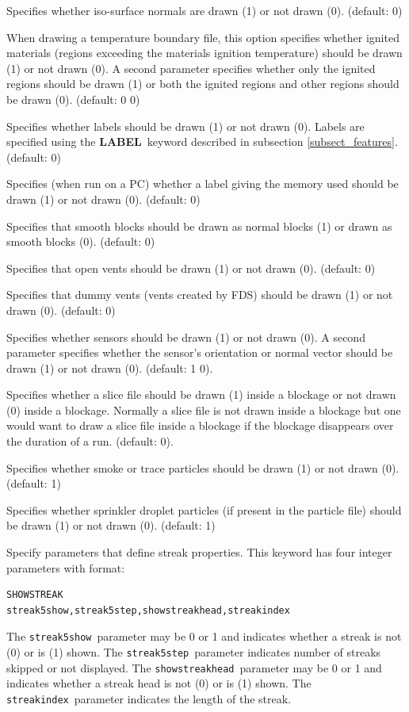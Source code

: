 \documentclass[11pt,twoside]{book}
\newcommand{\hitem}[1]{\item[{\bf #1} \hfill]}
\begin{document}
\hitem{SHOWISONORMALS} Specifies whether iso-surface normals are drawn (1) or not drawn (0).  (default: 0)

\hitem{SHOWIGNITION} When drawing a temperature boundary file, this option
specifies whether ignited materials (regions exceeding the materials ignition temperature) should be drawn (1) or not drawn (0).  A second parameter specifies whether only the ignited regions should be drawn (1) or both the ignited regions and other regions should be drawn (0).
(default: 0 0)


\hitem{SHOWLABELS}Specifies whether labels should be drawn (1) or
not drawn (0).  Labels are specified using the {\bf LABEL}\
keyword described in subsection \ref{subsect_features}. (default:
0)

\hitem{SHOWMEMLOAD} Specifies (when run on a PC) whether a label
giving the memory used should be drawn (1) or not drawn (0).
(default: 0)

\hitem{SHOWNORMALWHENSMOOTH} Specifies that smooth blocks
should be drawn as normal blocks (1) or drawn as smooth
blocks (0). (default: 0)

\hitem{SHOWOPENVENTS} Specifies that open vents should be drawn
(1) or not drawn (0).  (default: 0)

\hitem{SHOWDUMMYVENTS} Specifies that dummy vents (vents created
by FDS) should be drawn (1) or not drawn (0).  (default: 0)

\hitem{SHOWSENSORS} Specifies whether sensors should be drawn (1) or not drawn (0).
A second parameter specifies whether the sensor's orientation or normal vector
should be drawn (1) or not drawn (0). (default: 1 0).

\hitem{SHOWSLICEINOBST} Specifies whether a slice file should be drawn (1) inside
a blockage or not drawn (0) inside a blockage.  Normally a slice file is not drawn inside a blockage but one would want to draw a
slice file inside a blockage if the blockage disappears over the duration of a run.  (default: 0).


\hitem{SHOWSMOKEPART}Specifies whether smoke or trace particles
should be drawn (1) or not drawn (0). (default: 1)

\hitem{SHOWSPRINKPART}Specifies whether
sprinkler droplet particles (if present in the particle file)
should be drawn (1) or not drawn (0).
(default: 1)

\hitem{SHOWSTREAK}Specify parameters that define streak properties.  This keyword
has four integer parameters with format:
\begin{verbatim}
SHOWSTREAK
streak5show,streak5step,showstreakhead,streakindex
\end{verbatim}
The {\tt streak5show}\ parameter may be 0 or 1 and indicates whether a
streak is not (0) or is (1) shown. The {\tt streak5step}\ parameter
indicates number of streaks skipped or not displayed.
The {\tt showstreakhead}\ parameter may be 0 or 1 and indicates whether a streak head is not (0) or is (1) shown.
The {\tt streakindex}\ parameter indicates the length of the streak.
\end{document}
